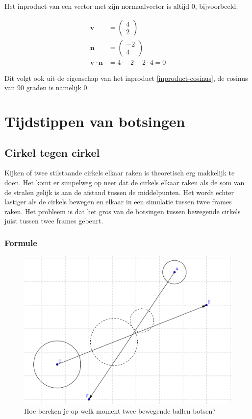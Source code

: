 \documentclass[12pt,a4paper]{article}
\begin{document}
	Het inproduct van een vector met zijn normaalvector is altijd 0, bijvoorbeeld:
	
	\begin{equation}
		\begin{aligned}
			\mathbf{v} &= \begin{pmatrix} 4 \\ 2 \end{pmatrix}\\
			\mathbf{n} &= \begin{pmatrix} -2 \\ 4 \end{pmatrix} \\
			\mathbf{v} \cdot \mathbf{n} &= 4 \cdot -2 + 2 \cdot 4 = 0
		\end{aligned}
	\end{equation}
	
	Dit volgt ook uit de eigenschap van het inproduct \eqref{inproduct-cosinus}, de cosinus van 90 graden is namelijk 0.

	\newpage

	\section{Tijdstippen van botsingen}
	
	\subsection{Cirkel tegen cirkel}
	Kijken of twee stilstaande cirkels elkaar raken is theoretisch erg makkelijk te doen. Het komt er simpelweg op neer dat de cirkels elkaar raken als de som van de stralen gelijk is aan de afstand tussen de middelpunten. Het wordt echter lastiger als de cirkels bewegen en elkaar in een simulatie tussen twee frames raken. Het probleem is dat het gros van de botsingen tussen bewegende cirkels juist tussen twee frames gebeurt.
	
	\subsubsection{Formule}
	\begin{figure}[h]
		\centerline{\includegraphics[width=\textwidth]{Plaatjes/Bal-Bal.png}}
		\caption{Hoe bereken je op welk moment twee bewegende ballen botsen?}
		\label{bal-bal}
	\end{figure}
	
\end{document}
